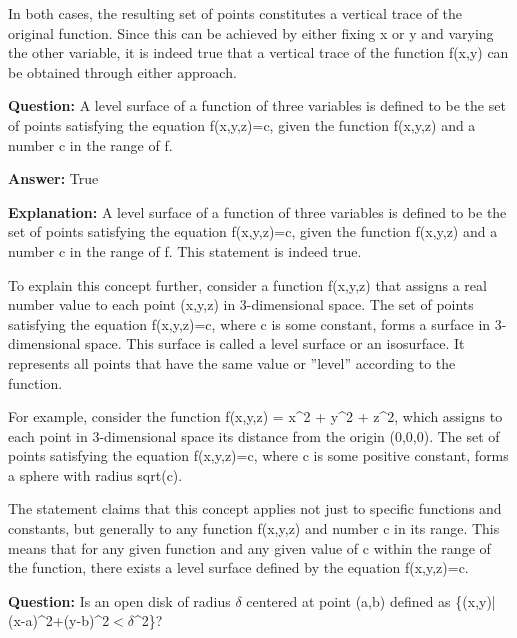 \documentclass{article}
\begin{document}
In both cases, the resulting set of points constitutes a vertical trace of the original function. Since this can be achieved by either fixing x or y and varying the other variable, it is indeed true that a vertical trace of the function f(x,y) can be obtained through either approach.
                
                \vspace{0.5cm} 
        
            
                \textbf {Question:} A level surface of a function of three variables is defined to be the set of points satisfying the equation f(x,y,z)=c, given the function f(x,y,z) and a number c in the range of f.
                
                \textbf{Answer:} True

                \textbf{Explanation:} A level surface of a function of three variables is defined to be the set of points satisfying the equation f(x,y,z)=c, given the function f(x,y,z) and a number c in the range of f. This statement is indeed true.

To explain this concept further, consider a function f(x,y,z) that assigns a real number value to each point (x,y,z) in 3-dimensional space. The set of points satisfying the equation f(x,y,z)=c, where c is some constant, forms a surface in 3-dimensional space. This surface is called a level surface or an isosurface. It represents all points that have the same value or ''level'' according to the function.

For example, consider the function f(x,y,z) = x{\textasciicircum}2 + y{\textasciicircum}2 + z{\textasciicircum}2, which assigns to each point in 3-dimensional space its distance from the origin (0,0,0). The set of points satisfying the equation f(x,y,z)=c, where c is some positive constant, forms a sphere with radius sqrt(c).

The statement claims that this concept applies not just to specific functions and constants, but generally to any function f(x,y,z) and number c in its range. This means that for any given function and any given value of c within the range of the function, there exists a level surface defined by the equation f(x,y,z)=c.
                
                \vspace{0.5cm} 
        
            
                \textbf {Question:} Is an open disk of radius \ensuremath{\delta} centered at point (a,b) defined as \{(x,y)|(x-a){\textasciicircum}2+(y-b){\textasciicircum}2\ensuremath{<}\ensuremath{\delta}{\textasciicircum}2\}?
                
\end{document}

